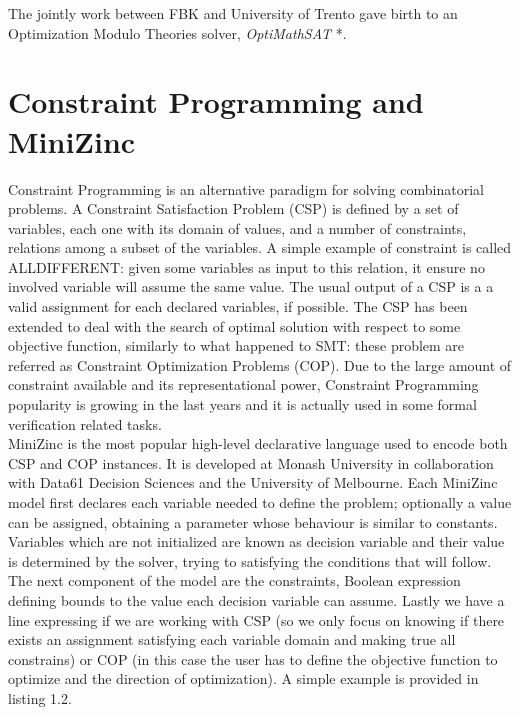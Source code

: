 The jointly work between FBK and University of Trento gave birth to an Optimization Modulo Theories solver, \textit{OptiMathSAT} \cite{pa25}*.

\section{Constraint Programming and MiniZinc}

Constraint Programming is an alternative paradigm for solving combinatorial problems. A Constraint Satisfaction Problem (CSP) is defined by a set of variables, each one with its domain of values, and a number of constraints, relations among a subset of the variables. A simple example of constraint is called ALLDIFFERENT: given some variables as input to this relation, it ensure no involved variable will assume the same value. The usual output of a CSP is a a valid assignment for each declared variables, if possible. The CSP has been extended to deal with the search of optimal solution with respect to some objective function, similarly to what happened to SMT: these problem are referred as Constraint Optimization Problems (COP).
Due to the large amount of constraint available and its representational power, Constraint Programming popularity is growing in the last years and it is actually used in some formal verification related tasks. \\
MiniZinc is the most popular high-level declarative language used to encode both CSP and COP instances. It is developed at Monash University in collaboration with Data61 Decision Sciences and the University of Melbourne. Each MiniZinc model first declares each variable needed to define the problem; optionally a value can be assigned, obtaining a parameter whose behaviour is similar to constants. Variables which are not initialized are known as decision variable and their value is determined by the solver, trying to satisfying the conditions that will follow. The next component of the model are the constraints, Boolean expression defining bounds to the value each decision variable can assume. Lastly we have a line expressing if we are working with CSP (so we only focus on knowing if there exists an assignment satisfying each variable domain and making true all constrains) or COP (in this case the user has to define the objective function to optimize and the direction of optimization). A simple example is provided in listing 1.2.

